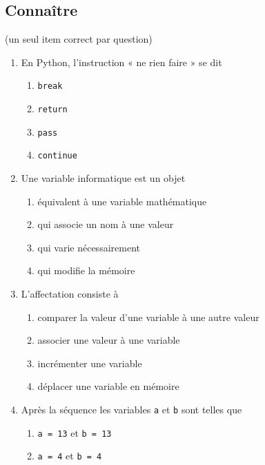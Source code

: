 \subsection{Connaître}
\begin{td}[QCM (2)]\label{td:qcmInstruc}(un seul item correct par question)
\em
\begin{enumerate}
\item En {\sc Python}, l'instruction « ne rien faire » se dit
	\begin{enumerate}
	\item {\tt break}
	\item {\tt return}
	\item {\tt pass}
	\item {\tt continue}
	\end{enumerate}
\item Une variable informatique est un objet 
	\begin{enumerate}
	\item équivalent à une variable mathématique
	\item qui associe un nom à une valeur
	\item qui varie nécessairement
	\item qui modifie la mémoire
	\end{enumerate}
\item L'affectation consiste à
	\begin{enumerate}
	\item comparer la valeur d'une variable à une autre valeur
	\item associer une valeur à une variable
	\item incrémenter une variable
	\item déplacer une variable en mémoire
	\end{enumerate}
\item Après la séquence  les variables {\tt a} et {\tt b} sont telles que
	\begin{enumerate}
	\item {\tt a = 13} et {\tt b = 13}
	\item {\tt a = 4} et {\tt b = 4}

\end{enumerate}
\end{enumerate}
\end{td}
